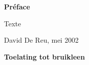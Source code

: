 
\newpage

\noindent \textbf{\huge Préface}

\vspace{1.5cm}

\noindent
Texte

\addvspace{4cm}

\noindent David De Reu, mei 2002\newpage

\noindent \textbf{\huge Toelating tot bruikleen}

\vspace{1.5cm}

\noindent


\addvspace{4cm}


